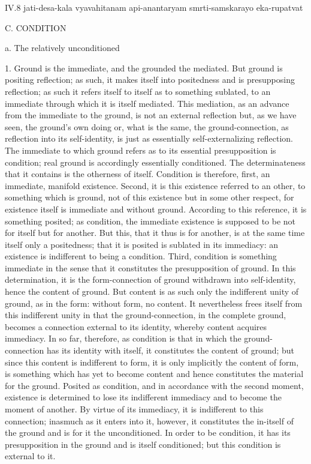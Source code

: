 IV.8
jati-desa-kala vyavahitanam api-anantaryam smrti-samskarayo eka-rupatvat

C. CONDITION

a. The relatively unconditioned

1. Ground is the immediate,
and the grounded the mediated.
But ground is positing reflection;
as such, it makes itself into positedness
and is presupposing reflection;
as such it refers itself to itself
as to something sublated,
to an immediate through which
it is itself mediated.
This mediation, as an advance
from the immediate to the ground,
is not an external reflection
but, as we have seen, the ground's own doing
or, what is the same, the ground-connection,
as reflection into its self-identity,
is just as essentially self-externalizing reflection.
The immediate to which ground refers as
to its essential presupposition is condition;
real ground is accordingly essentially conditioned.
The determinateness that it contains is
the otherness of itself.
Condition is therefore,
first, an immediate, manifold existence.
Second, it is this existence referred to an other,
to something which is ground,
not of this existence but in some other respect,
for existence itself is immediate and without ground.
According to this reference, it is something posited;
as condition, the immediate existence is supposed to be
not for itself but for another.
But this, that it thus is for another, is at the same time
itself only a positedness;
that it is posited is sublated in its immediacy:
an existence is indifferent to being a condition.
Third, condition is something immediate in the sense
that it constitutes the presupposition of ground.
In this determination, it is the form-connection of ground
withdrawn into self-identity, hence the content of ground.
But content is as such only the indifferent unity of ground,
as in the form: without form, no content.
It nevertheless frees itself
from this indifferent unity
in that the ground-connection,
in the complete ground,
becomes a connection external to its identity,
whereby content acquires immediacy.
In so far, therefore, as condition is
that in which the ground-connection has
its identity with itself,
it constitutes the content of ground;
but since this content is indifferent to form,
it is only implicitly the content of form,
is something which has yet to become content
and hence constitutes the material for the ground.
Posited as condition,
and in accordance with the second moment,
existence is determined to lose its indifferent immediacy
and to become the moment of another.
By virtue of its immediacy, it is indifferent to this connection;
inasmuch as it enters into it, however,
it constitutes the in-itself of the ground
and is for it the unconditioned.
In order to be condition,
it has its presupposition in the ground
and is itself conditioned;
but this condition is external to it.

